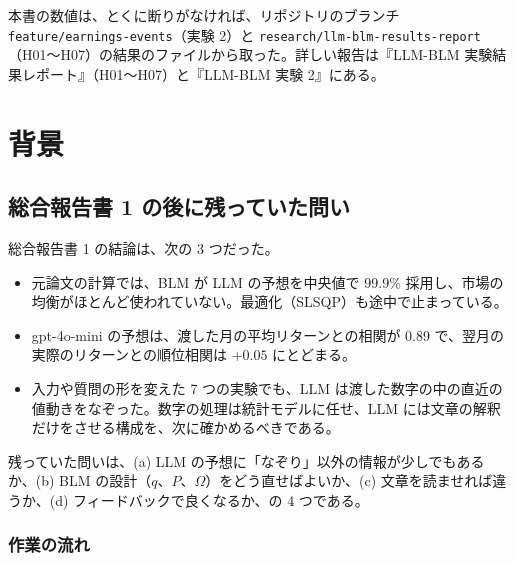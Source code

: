 \documentclass[xelatex,ja=standard,jafont=haranoaji,a4paper,10pt]{bxjsreport}
\newcommand{\code}[1]{\texttt{#1}}
\begin{document}
本書の数値は、とくに断りがなければ、リポジトリのブランチ \code{feature/earnings-events}（実験 2）と \code{research/llm-blm-results-report}（H01〜H07）の結果のファイルから取った。詳しい報告は『LLM-BLM 実験結果レポート』（H01〜H07）と『LLM-BLM 実験 2』にある。

\setcounter{tocdepth}{1}
\tableofcontents

\part{背景}

\chapter{総合報告書 1 の後に残っていた問い}\label{ch:intro}

総合報告書 1 の結論は、次の 3 つだった。

\begin{itemize}
\item 元論文の計算では、BLM が LLM の予想を中央値で 99.9\% 採用し、市場の均衡がほとんど使われていない。最適化（SLSQP）も途中で止まっている。
\item gpt-4o-mini の予想は、渡した月の平均リターンとの相関が 0.89 で、翌月の実際のリターンとの順位相関は $+0.05$ にとどまる。
\item 入力や質問の形を変えた 7 つの実験でも、LLM は渡した数字の中の直近の値動きをなぞった。数字の処理は統計モデルに任せ、LLM には文章の解釈だけをさせる構成を、次に確かめるべきである。
\end{itemize}

残っていた問いは、(a) LLM の予想に「なぞり」以外の情報が少しでもあるか、(b) BLM の設計（$q$、$P$、$\Omega$）をどう直せばよいか、(c) 文章を読ませれば違うか、(d) フィードバックで良くなるか、の 4 つである。

\section{作業の流れ}
\end{document}
